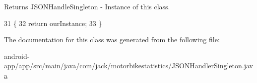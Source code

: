 \begin{DoxyReturn}{Returns}
J\+S\+O\+N\+Handle\+Singleton -\/ Instance of this class. 
\end{DoxyReturn}

\begin{DoxyCode}
31                                                      \{
32         \textcolor{keywordflow}{return} ourInstance;
33     \}
\end{DoxyCode}


The documentation for this class was generated from the following file\+:\begin{DoxyCompactItemize}
\item 
android-\/app/app/src/main/java/com/jack/motorbikestatistics/\hyperlink{_j_s_o_n_handler_singleton_8java}{J\+S\+O\+N\+Handler\+Singleton.\+java}\end{DoxyCompactItemize}
